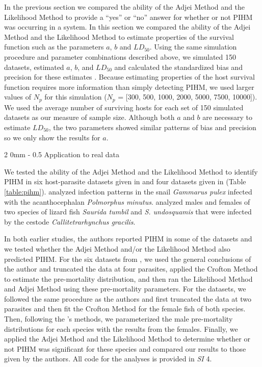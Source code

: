 \documentclass[12pt, a4paper]{article}
\makeatletter
\renewcommand{\subsection}{\@startsection
{subsection}%
{2}%
{0mm}%
{-\baselineskip}%
{0.5\baselineskip}%
{\normalfont\bf}} %
\makeatother
\begin{document}
In the previous section we compared the ability of the Adjei Method and the Likelihood Method to provide a ``yes'' or ``no'' answer for whether or not PIHM was occurring in a system. In this section we compared the ability of the Adjei Method and the Likelihood Method to estimate properties of the survival function such as the parameters $a$, $b$ and $LD_{50}$.  Using the same simulation procedure and parameter combinations described above, we simulated 150 datasets, estimated $a$, $b$, and $LD_{50}$ and calculated the standardized bias and
precision for these estimates \citep{Walther2005}.  Because estimating properties of the host survival function requires more information than simply detecting PIHM, we used larger values of $N_p$ for this simulation ($N_p$ = [300, 500, 1000, 2000, 5000, 7500,
10000]).  We used the average number of surviving hosts for each set of 150 simulated datasets as our measure of sample size.  Although both $a$ and $b$ are necessary to estimate $LD_{50}$, the two parameters showed similar patterns of bias and precision so we only show the results for $a$.

\subsection{Application to real data}

We tested the ability of the Adjei Method and the Likelihood Method to identify
PIHM in six host-parasite datasets given in \cite{Crofton1971a} and four datasets
given in \cite{Adjei1986} (Table \ref{table:pihm}). \citeauthor{Crofton1971a} analyzed infection patterns in the snail \emph{Gammarus pulex} infected with the
acanthocephalan \emph{Polmorphus minutus}. \citeauthor{Adjei1986} analyzed males and females of two species of lizard fish \emph{Saurida tumbil} and
\emph{S. undosquamis} that were infected by the cestode
\emph{Callitetrarhynchus gracilis}.

In both earlier studies, the authors reported PIHM in some of the datasets and we tested whether the Adjei
Method and/or the Likelihood Method also predicted PIHM. For the six datasets from
\cite{Crofton1971a}, we used the general conclusions of the author and truncated the data at four parasites, applied the Crofton
Method to estimate the pre-mortality distribution, and then ran the Likelihood
Method and Adjei Method using these pre-mortality parameters.  For the
\cite{Adjei1986} datasets, we followed the same procedure as the authors and
first truncated the data at two parasites and then fit the Crofton Method for the
female fish of both species.  Then, following the \citeauthor{Adjei1986}'s methods, we parameterized the male pre-mortality
distributions for each species with the results from the females.  Finally, we
applied the Adjei Method and the Likelihood Method to determine whether or not
PIHM was significant for these species and compared our results to those given by the authors.  All code for the analyses is provided in \emph{SI} 4.
\end{document}
